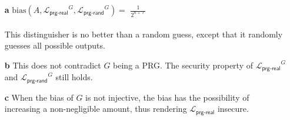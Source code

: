 \documentclass[12pt]{article}
\renewcommand{\L}{\ensuremath{\mathscr{L}}\xspace}
\newcommand{\lib}[1]{\ensuremath{\L_{\textsf{#1}}}\xspace}
\newcommand{\myterm}[1]{\ensuremath{\text{#1}}\xspace}
\newcommand{\bias}{\myterm{bias}}
\begin{document}
\begin{itemize}
    \item[\textbf{a}] $\bias(A, \lib{prg-real}^G, \lib{prg-rand}^G) =$
        $\frac{1}{2^{n+\ell}}$\\\\
        This distinguisher is no better than a random guess, except that
        it randomly guesses all possible outputs. 
    \item[\textbf{b}] This does not contradict $G$ being a PRG. The
        security property of $\lib{prg-real}^G$ and $\lib{prg-rand}^G$
        still holds.
    \item[\textbf{c}] When the bias of $G$ is not injective, the bias
        has the possibility of increasing a non-negligible amount, thus
        rendering $\lib{prg-real}$ insecure.
\end{itemize}
\end{document}
